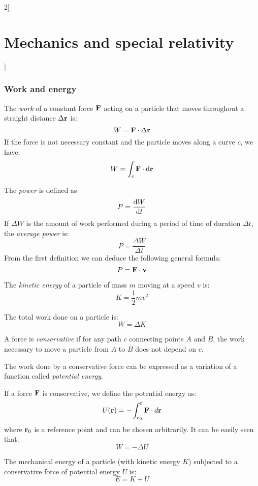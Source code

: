 \documentclass[../../../main.tex]{subfiles}
\begin{document}
\begin{multicols}{2}[\section{Mechanics and special relativity}]
  \subsubsection{Work and energy}
  \begin{definition}[Work]
    The \emph{work} of a constant force $\boldsymbol{\mathrm{F}}$ acting on a particle that moves throughout a straight distance $\Delta\boldsymbol{\mathrm{r}}$ is: $$ W=\boldsymbol{\mathrm{F}}\cdot\Delta\boldsymbol{\mathrm{r}}$$ If the force is not necessary constant and the particle moves along a curve $c$, we have: $$W=\int_c\boldsymbol{\mathrm{F}}\cdot \dd{\boldsymbol{\mathrm{r}}}$$
  \end{definition}
  \begin{definition}[Power]
    The \emph{power} is defined as $$P=\dv{W}{t}$$ If $\Delta W$ is the amount of work performed during a period of time of duration $\Delta t$, the \emph{average power} is: $$P=\frac{\Delta W}{\Delta t}$$ From the first definition we can deduce the following general formula: $$P=\boldsymbol{\mathrm{F}}\cdot\boldsymbol{\mathrm{v}}$$
  \end{definition}
  \begin{definition}
    The \emph{kinetic energy} of a particle of mass $m$ moving at a speed $v$ is: $$K=\frac{1}{2}mv^2$$
  \end{definition}
  \begin{theorem}
    The total work done on a particle is:
    $$W=\Delta K$$
  \end{theorem}
  \begin{definition}
    A force is \emph{conservative} if for any path $c$ connecting points $A$ and $B$, the work necessary to move a particle from $A$ to $B$ does not depend on $c$.
  \end{definition}
  \begin{proposition}
    The work done by a conservative force can be expressed as a variation of a function called \emph{potential energy}.
  \end{proposition}
  \begin{proposition}
    If a force $\boldsymbol{\mathrm{F}}$ is conservative, we define the potential energy as: $$U(\boldsymbol{\mathrm{r}})=-\int_{\boldsymbol{\mathrm{r}}_0}^{\boldsymbol{\mathrm{r}}}\boldsymbol{\mathrm{F}}\cdot d\boldsymbol{\mathrm{r}}$$ where $\boldsymbol{\mathrm{r}}_0$ is a reference point and can be chosen arbitrarily. It can be easily seen that: $$W=-\Delta U$$
  \end{proposition}
  \begin{proposition}
    The mechanical energy of a particle (with kinetic energy $K$) subjected to a conservative force of potential energy $U$ is: $$E=K+U$$

\end{proposition}
\end{multicols}
\end{document}
